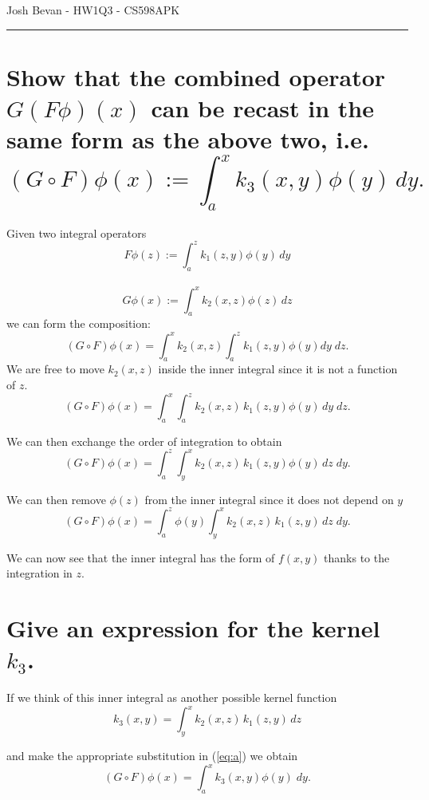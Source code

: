 \documentclass[letterpaper,10pt]{article}
\newcommand{\ben}[1]{\begin{equation}\label{#1}}
\newcommand{\ee}{\end{equation}}
\begin{document}
\begin{flushright}
{\Large Josh Bevan - HW1Q3 - CS598APK}
\end{flushright}
\vskip -0.1in
\hrule
\vskip 0.4in

\vskip 0.1in
\section*{
Show that the combined
operator $G(F\phi)(x)$ can be recast in the same form as the above two,
i.e.
$$
(G\circ F) \phi(x):=\int_a^x k_3(x,y) \phi(y) \, d y.
$$}

Given two integral operators
$$  F \phi(z):=\int_a^z k_1(z,y) \phi(y) \, d y$$\\ $$ G \phi(x):=\int_a^x k_2(x,z) \phi(z) \, d z $$
 we can form the composition:
$$
(G\circ F) \phi(x) = \int_a^x k_2(x,z) 
\int_a^z k_1(z,y) \phi(y) d y \;
 d z.
$$
We are free to move $k_2(x,z)$ inside the inner integral since it is not a function of $z$.
$$
(G\circ F) \phi(x) = \int_a^x  
\int_a^z k_2(x,z) \, k_1(z,y) \phi(y) \, d y \;
 d z.
$$

We can then exchange the order of integration to obtain
$$
(G\circ F) \phi(x) = \int_a^z  
\int_y^x k_2(x,z) \, k_1(z,y) \phi(y) \, d z \;
 d y.
$$

We can then remove $\phi(z)$ from the inner integral since it does not depend on $y$
\ben{eq:a}
(G\circ F) \phi(x) = \int_a^z \phi(y) 
\int_y^x k_2(x,z) \, k_1(z,y) \, d z \;
 d y.
\ee

We can now see that the inner integral has the form of $f(x,y)$ thanks to the integration in $z$.

\vskip 0.1in
\section*{Give an expression for the kernel $k_3$.}
If we think of this inner integral as another possible kernel function
$$
k_3(x,y) = \int_y^x k_2(x,z) \, k_1(z,y) \, d z
$$

and make the appropriate substitution in (\ref{eq:a}) we obtain
$$
(G\circ F) \phi(x) = \int_a^x k_3(x,y) \phi(y) \; d y.
$$
\end{document}
